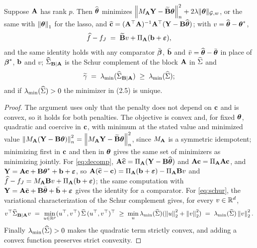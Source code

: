 \begin{lemma}
\label{lem:profile}
Suppose $\Amat$ has rank $p$. Then $\thetahat$ minimizes
$\normn{\MA\bY-\Btil\btheta}^2+2\pen\nGw{\btheta}$,
or the same with $\norm{\btheta}_1$ for the lasso, and
$\chat = (\Amat\T\Amat)^{-1}\Amat\T(\bY-\Bmat\thetahat)$; with
$v = \thetahat-\thetastar$,
\begin{equation}
  \label{eq:decomp}
  \widehat{f}-f_J \;=\; \Btil v + \PA(\bb+\bveps),
\end{equation}
and the same identity holds with any comparator
$\bar\bbeta$, $\bbar$ and $\vbar = \thetahat-\thbar$ in place of $\betastar$,
$\bb$ and $v$;
$\GBA$ is the Schur complement of the block $\Amat$ in $\Gramhat$ and
\begin{equation}
  \label{eq:schur}
  \gtil \;=\; \lmin(\GBA) \;\ge\; \lmin(\Gramhat);
\end{equation}
and if $\lmin(\Gramhat)>0$ the minimizer in (2.5) is unique.
\end{lemma}

\begin{proof}
The argument uses only that the penalty does not depend on
$\bc$ and is convex, so it holds for both penalties. The objective is convex and, for fixed $\btheta$, quadratic and coercive in
$\bc$, with minimum at the stated value and minimized value
$\normn{\MA(\bY-\Bmat\btheta)}^2 = \normn{\MA\bY-\Btil\btheta}^2$, since $\MA$
is a symmetric idempotent; minimizing first in $\bc$ and then in $\btheta$
gives the same set of minimizers as minimizing jointly. For
\eqref{eq:decomp}, $\Amat\chat = \PA(\bY-\Bmat\thetahat)$ and
$\Amat\bc = \PA\Amat\bc$, and $\bY = \Amat\bc+\Bmat\thetastar+\bb+\bveps$, so
$\Amat(\chat-\bc) = \PA(\bb+\bveps)-\PA\Bmat v$ and
$\widehat{f}-f_J = \MA\Bmat v + \PA(\bb+\bveps)$; the same
computation with $\bY = \Amat\bar\bc + \Bmat\thbar + \bbar + \bveps$ gives the
identity for a comparator. For \eqref{eq:schur}, the
variational characterization of the Schur complement gives, for every
$v \in \R^d$,
\[
  v\T\GBA v \;=\; \min_{u\in\R^p}(u\T,v\T)\,\Gramhat\,(u\T,v\T)\T
  \;\ge\; \min_{u}\lmin(\Gramhat)(\norm{u}_2^2+\norm{v}_2^2)
  \;=\; \lmin(\Gramhat)\norm{v}_2^2 .
\]
Finally $\lmin(\Gramhat)>0$ makes the quadratic term strictly convex, and
adding a convex function preserves strict convexity.
\end{proof}


